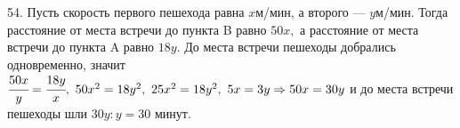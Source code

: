 54. Пусть скорость первого пешехода равна $x$м/мин, а второго --- $y$м/мин. Тогда расстояние от места встречи до пункта B равно $50x,$ а расстояние от места встречи до пункта A равно $18y.$ До места встречи пешеходы добрались одновременно, значит $\cfrac{50x}{y}=\cfrac{18y}{x},\ 50x^2=18y^2,\ 25x^2=18y^2,\ 5x=3y\Rightarrow50x=30y$ и до места встречи пешеходы шли $30y:y=30$ минут.\\
